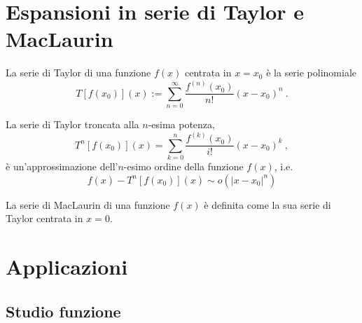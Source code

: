 \section{Espansioni in serie di Taylor e MacLaurin}\label{ch:taylor}
\begin{definition} La serie di Taylor di una funzione $f(x)$ centrata in $x=x_0$ è la serie polinomiale
\begin{equation}
   T[f(x_0)](x) := \sum_{n=0}^{\infty} \dfrac{f^{(n)}(x_0)}{n!} (x-x_0)^n \ .
\end{equation}
\end{definition}
%
\begin{theorem}
La serie di Taylor troncata alla $n$-esima potenza,
\begin{equation}
  T^n[f(x_0)](x) = \sum_{k=0}^{n} \dfrac{f^{(k)}(x_0)}{i!} (x-x_0)^k \ ,
\end{equation}
è un'approssimazione dell'$n$-esimo ordine della funzione $f(x)$, i.e.
\begin{equation}
  f(x) - T^n[f(x_0)](x) \sim o(|x-x_0|^{n})
\end{equation}
\end{theorem}

\begin{definition} La serie di MacLaurin di una funzione $f(x)$ è definita come la sua serie di Taylor centrata in $x=0$.
\end{definition}

\section{Applicazioni}
\subsection{Studio funzione}
